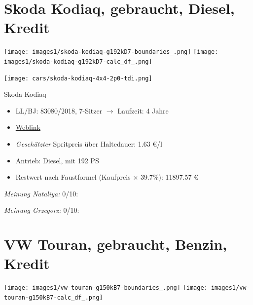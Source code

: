 \documentclass[landscape, DIV=99, 14pt]{scrartcl}
\begin{document}
\pagebreak


\twocolumn

\section*{Skoda Kodiaq, gebraucht, Diesel, Kredit}
\begin{center}
\texttt{[image: images1/skoda-kodiaq-g192kD7-boundaries\_.png]}
\null
\vspace{0.5cm}
\texttt{[image: images1/skoda-kodiaq-g192kD7-calc\_df\_.png]}
\end{center}

\pagebreak
\begin{center}
\texttt{[image: cars/skoda-kodiaq-4x4-2p0-tdi.png]}

Skoda Kodiaq
\end{center}

\begin{itemize}
    \item LL/BJ: 83080/2018, 7-Sitzer $\rightarrow$ Laufzeit: 4 Jahre
    \item \href{https://suchen.mobile.de/fahrzeuge/details.html?action=parkItem&id=336544234}{Weblink}
    \item \emph{Gesch\"atzter} Spritpreis \"uber Haltedauer: 1.63 \euro{}/l
    \item Antrieb: Diesel, mit 192 PS
    \item Restwert nach Faustformel (Kaufpreis $\times$ 39.7\%): 11897.57 \euro{}
\end{itemize}

\begin{small}
\emph{Meinung Nataliya:} 0/10: 
        
\emph{Meinung Grzegorz:} 0/10: 
\end{small}

\pagebreak


\twocolumn

\section*{VW Touran, gebraucht, Benzin, Kredit}
\begin{center}
\texttt{[image: images1/vw-touran-g150kB7-boundaries\_.png]}
\null
\vspace{0.5cm}
\texttt{[image: images1/vw-touran-g150kB7-calc\_df\_.png]}
\end{center}
\end{document}
